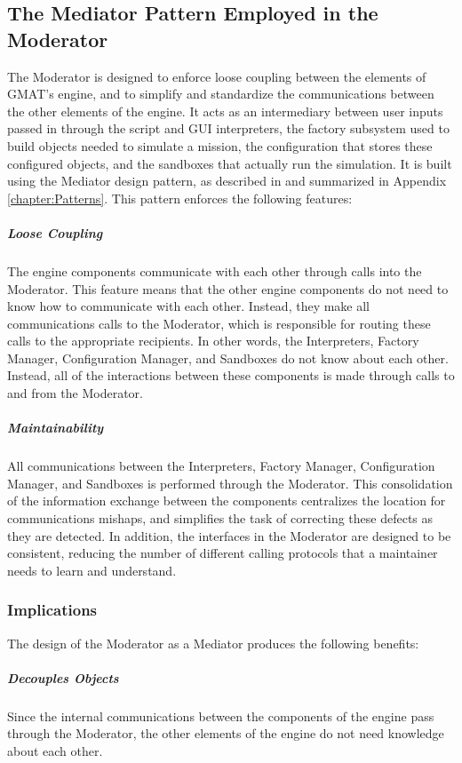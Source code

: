 \subsection{\label{section:ModeratorMediator}The Mediator Pattern Employed in the Moderator}

The Moderator is designed to enforce loose coupling between the elements of GMAT's engine, and to
simplify and standardize the communications between the other elements of the engine. It acts as an
intermediary between user inputs passed in through the script and GUI interpreters, the factory
subsystem used to build objects needed to simulate a mission, the configuration that stores these
configured objects, and the sandboxes that actually run the simulation.  It is built using the
Mediator design pattern, as described in \cite{GoF} and summarized in Appendix
\ref{chapter:Patterns}.  This pattern enforces the following features:

\subparagraph{\textit{Loose Coupling}}  The engine components communicate with each other through
calls into the Moderator.  This feature means that the other engine components do not need to know
how to communicate with each other.  Instead, they make all communications calls to the Moderator,
which is responsible for routing these calls to the appropriate recipients.  In other words, the
Interpreters, Factory Manager, Configuration Manager, and Sandboxes do not know about each other. 
Instead, all of the interactions between these components is made through calls to and from the
Moderator.

\subparagraph{\textit{Maintainability}}  All communications between the Interpreters, Factory
Manager, Configuration Manager, and Sandboxes is performed through the Moderator.  This
consolidation of the information exchange between the components centralizes the location for
communications mishaps, and simplifies the task of correcting these defects as they are detected. 
In addition, the interfaces in the Moderator are designed to be consistent, reducing the number of
different calling protocols that a maintainer needs to learn and understand.

\subsubsection{Implications}

The design of the Moderator as a Mediator produces the following benefits:

\subparagraph{\textit{Decouples Objects}}  Since the internal communications between the components
of the engine pass through the Moderator, the other elements of the engine do not need knowledge
about each other.

